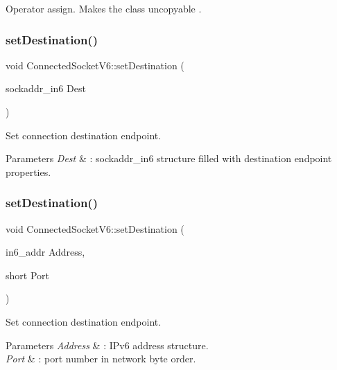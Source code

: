 Operator assign. Makes the class uncopyable . \mbox{\label{classConnectedSocketV6_ac95a20c1700d3a95b83c253c695f9838}} 
\subsubsection{\texorpdfstring{set\+Destination()}{setDestination()}\hspace{0.1cm}{\footnotesize\ttfamily [1/3]}}
{\footnotesize\ttfamily void Connected\+Socket\+V6\+::set\+Destination (\begin{DoxyParamCaption}\item[{sockaddr\+\_\+in6}]{Dest }\end{DoxyParamCaption})\hspace{0.3cm}{\ttfamily [inline]}}

Set connection destination endpoint. 
\begin{DoxyParams}{Parameters}
{\em Dest} & \+: sockaddr\+\_\+in6 structure filled with destination endpoint properties. \\
\hline
\end{DoxyParams}
\mbox{\label{classConnectedSocketV6_aa4f9dd426ff72420bdd315a9668d2139}} 
\subsubsection{\texorpdfstring{set\+Destination()}{setDestination()}\hspace{0.1cm}{\footnotesize\ttfamily [2/3]}}
{\footnotesize\ttfamily void Connected\+Socket\+V6\+::set\+Destination (\begin{DoxyParamCaption}\item[{in6\+\_\+addr}]{Address,  }\item[{short}]{Port }\end{DoxyParamCaption})}

Set connection destination endpoint. 
\begin{DoxyParams}{Parameters}
{\em Address} & \+: I\+Pv6 address structure. \\
\hline
{\em Port} & \+: port number in network byte order. \\
\hline
\end{DoxyParams}
\mbox{\label{classConnectedSocketV6_aefa8952aeb0d63332c4afcd5538b118e}} 
